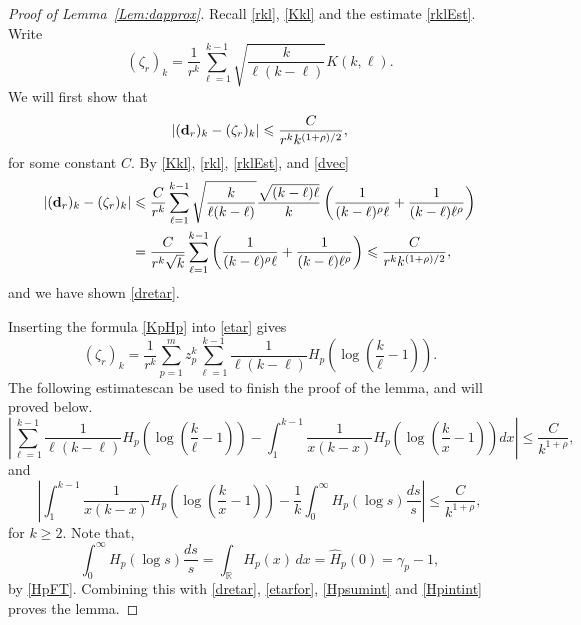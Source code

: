 \documentclass{article}
\numberwithin{equation}{section}
\numberwithin{figure}{section}
\theoremstyle{plain}
\theoremstyle{plain}
\numberwithin{thm}{section}
\theoremstyle{remark}
\newcommand{\R}{\mathbb{R}}
\let \le \leqslant
\let \ge \geqslant
\begin{document}
\begin{proof}[Proof of Lemma~\ref{Lem:dapprox}]
    Recall \eqref{rkl}, \eqref{Kkl} and the estimate \eqref{rklEst}. Write
    \begin{equation}\label{etar}
     (\zeta_r)_k=\frac 1{r^k}\sum_{\ell=1}^{k-1}\sqrt{\frac{k}{\ell(k-\ell)}}K(k,\ell).   
    \end{equation}
We will first show that
\begin{equation}\label{dretar}
 |({\bf d}_r)_k-(\zeta_r)_k| \le \frac{C}{r^kk^{(1+\rho)/2}},
\end{equation}
for some constant $C$. By \eqref{Kkl}, \eqref{rkl}, \eqref{rklEst}, and \eqref{dvec}
\begin{align*}
  |({\bf d}_r)_k-(\zeta_r)_k| &\le \frac{C}{r^k}\sum_{\ell=1}^{k-1} \sqrt{\frac{k}{\ell(k-\ell)}}\frac{\sqrt{(k-\ell)\ell}}k\left(\frac 1{(k-\ell)^\rho\ell}+
\frac 1{(k-\ell)\ell^\rho}\right)\\
&=\frac{C}{r^k\sqrt{k}}\sum_{\ell=1}^{k-1}\left(\frac 1{(k-\ell)^\rho\ell}+
\frac 1{(k-\ell)\ell^\rho}\right)\le \frac{C}{r^kk^{(1+\rho)/2}},
\end{align*}
and we have shown \eqref{dretar}. 

Inserting the formula \eqref{KpHp} into \eqref{etar} gives
\begin{equation}\label{etarfor}
(\zeta_r)_k=\frac 1{r^k}\sum_{p=1}^mz_p^k\sum_{\ell=1}^{k-1}\frac 1{\ell(k-\ell)}H_p(\log(\frac{k}{\ell}-1)).
\end{equation}
The following estimatescan be used to finish the proof of the lemma, and will proved below.
\begin{equation}\label{Hpsumint}
    \left|\sum_{\ell=1}^{k-1}\frac 1{\ell(k-\ell)}H_p(\log(\frac{k}{\ell}-1))-\int_1^{k-1}\frac 1{x(k-x)}H_p(\log(\frac kx-1))dx\right|\le \frac C{k^{1+\rho}},
\end{equation}
and 
\begin{equation}\label{Hpintint}
\left| \int_1^{k-1}\frac 1{x(k-x)}H_p(\log(\frac kx-1))   -\frac 1k\int_0^\infty H_p(\log s)\frac{ds}s\right|\le \frac C{k^{1+\rho}},
\end{equation}
for $k\ge 2$. Note that,
\begin{equation*}
 \int_0^\infty H_p(\log s)\frac{ds}s=\int_{\R}H_p(x)\,dx=\hat{H}_p(0)=\gamma_p-1,   
\end{equation*}
by \eqref{HpFT}. Combining this with \eqref{dretar}, \eqref{etarfor}, \eqref{Hpsumint} and \eqref{Hpintint} proves the lemma.


\end{proof}
\end{document}
